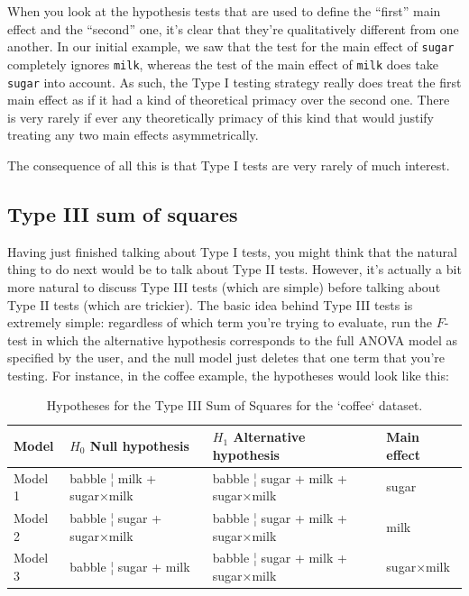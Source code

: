 \documentclass[
  11pt,
  a4paper,
  twoside,symmetric,openright]{book}
\theoremstyle{break}
\theoremstyle{break}
\begin{document}
When you look at the hypothesis tests that are used to define the ``first'' main effect and the ``second'' one, it's clear that they're qualitatively different from one another. In our initial example, we saw that the test for the main effect of \texttt{sugar} completely ignores \texttt{milk}, whereas the test of the main effect of \texttt{milk} does take \texttt{sugar} into account. As such, the Type I testing strategy really does treat the first main effect as if it had a kind of theoretical primacy over the second one. There is very rarely if ever any theoretically primacy of this kind that would justify treating any two main effects asymmetrically.

The consequence of all this is that Type I tests are very rarely of much interest.

\subsection{Type III sum of squares}\label{type-iii-sum-of-squares}

Having just finished talking about Type I tests, you might think that the natural thing to do next would be to talk about Type II tests. However, it's actually a bit more natural to discuss Type III tests (which are simple) before talking about Type II tests (which are trickier). The basic idea behind Type III tests is extremely simple: regardless of which term you're trying to evaluate, run the \(F\)-test in which the alternative hypothesis corresponds to the full ANOVA model as specified by the user, and the null model just deletes that one term that you're testing. For instance, in the coffee example, the hypotheses would look like this:

\begin{table}[!h]

\caption{\label{tab:unnamed-chunk-96}Hypotheses for the Type III Sum of Squares for the `coffee` dataset.}
\centering
\begin{tabular}[t]{llll}
\toprule
Model & $H_0$ Null hypothesis & $H_1$ Alternative hypothesis & Main effect\\
\midrule
Model 1 & babble ¦ milk + sugar×milk & babble ¦ sugar + milk + sugar×milk & sugar\\
Model 2 & babble ¦ sugar + sugar×milk & babble ¦ sugar + milk + sugar×milk & milk\\
Model 3 & babble ¦ sugar + milk & babble ¦ sugar + milk + sugar×milk & sugar×milk\\
\bottomrule
\end{tabular}
\end{table}
\end{document}
